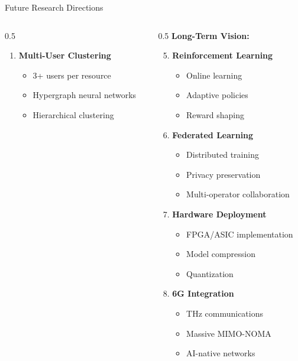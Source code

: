 \documentclass[aspectratio=169]{beamer}
\begin{document}
\begin{frame}{Future Research Directions}
\begin{columns}
\begin{column}{0.5\textwidth}
\begin{enumerate}
                \item \textbf{Multi-User Clustering}
                \begin{itemize}
                    \item 3+ users per resource
                    \item Hypergraph neural networks
                    \item Hierarchical clustering
                \end{itemize}
            \end{enumerate}
        \end{column}
        \begin{column}{0.5\textwidth}
            \textbf{Long-Term Vision:}
            \begin{enumerate}
                \setcounter{enumi}{4}
                \item \textbf{Reinforcement Learning}
                \begin{itemize}
                    \item Online learning
                    \item Adaptive policies
                    \item Reward shaping
                \end{itemize}
                
                \item \textbf{Federated Learning}
                \begin{itemize}
                    \item Distributed training
                    \item Privacy preservation
                    \item Multi-operator collaboration
                \end{itemize}
                
                \item \textbf{Hardware Deployment}
                \begin{itemize}
                    \item FPGA/ASIC implementation
                    \item Model compression
                    \item Quantization
                \end{itemize}
                
                \item \textbf{6G Integration}
                \begin{itemize}
                    \item THz communications
                    \item Massive MIMO-NOMA
                    \item AI-native networks
                \end{itemize}
            \end{enumerate}
        \end{column}
    \end{columns}
\end{frame}
\end{document}
